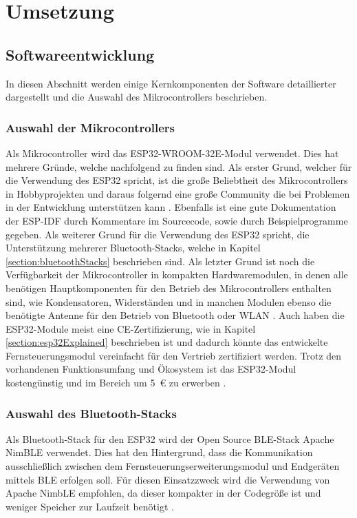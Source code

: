 
\chapter{Umsetzung}

\section{Softwareentwicklung}
In diesen Abschnitt werden einige Kernkomponenten der Software detaillierter dargestellt und die Auswahl des Mikrocontrollers beschrieben.

\subsection{Auswahl der Mikrocontrollers}
Als Mikrocontroller wird das ESP32-WROOM-32E-Modul verwendet. Dies hat mehrere Gründe, welche nachfolgend zu finden sind.
Als erster Grund, welcher für die Verwendung des ESP32 spricht, ist die große Beliebtheit des Mikrocontrollers in Hobbyprojekten und daraus folgernd eine große Community die bei Problemen in der Entwicklung unterstützen kann \cites{redditESP32}{esp32Forum}. Ebenfalls ist eine gute Dokumentation der \ac{ESP-IDF} durch Kommentare im Sourcecode, sowie durch Beispielprogramme gegeben. Als weiterer Grund für die Verwendung des ESP32 spricht, die Unterstützung mehrerer Bluetooth-Stacks, welche in Kapitel \ref{section:bluetoothStacks} beschrieben sind. Als letzter Grund ist noch die Verfügbarkeit der Mikrocontroller in kompakten Hardwaremodulen, in denen alle benötigen Hauptkomponenten für den Betrieb des Mikrocontrollers enthalten sind, wie Kondensatoren, Widerständen und in manchen Modulen ebenso die benötigte Antenne für den Betrieb von Bluetooth oder \acs{WLAN} \cite[S.~14]{espressifHardwareDesignGuidelines}. Auch haben die ESP32-Module meist eine CE-Zertifizierung, wie in Kapitel \ref{section:esp32Explained} beschrieben ist und dadurch könnte das entwickelte Fernsteuerungsmodul vereinfacht für den Vertrieb zertifiziert werden. Trotz den vorhandenen Funktionsumfang und Ökosystem ist das ESP32-Modul kostengünstig und im Bereich um 5~€ zu erwerben \cite{espressifModules}.

\subsection{Auswahl des Bluetooth-Stacks}
Als Bluetooth-Stack für den ESP32 wird der Open Source \ac{BLE}-Stack Apache NimBLE verwendet. Dies hat den Hintergrund, dass die Kommunikation ausschließlich zwischen dem Fernsteuerungserweiterungsmodul und Endgeräten mittels \ac{BLE} erfolgen soll. Für diesen Einsatzzweck wird die Verwendung von Apache NimbLE empfohlen, da dieser kompakter in der Codegröße ist und weniger Speicher zur Laufzeit benötigt \cite{espidfBluetoothStack}.

